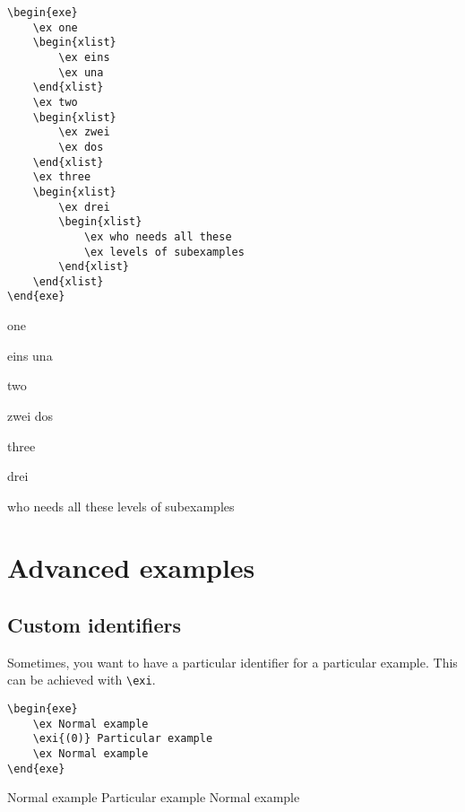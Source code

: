 \documentclass[output=guidelines]{langscibook}
\newcommand{\cmd}[1]{\texttt{\textbackslash#1}}
\begin{document}
\begin{minipage}{.55\textwidth}
\begin{lstlisting}
\begin{exe}
    \ex one
    \begin{xlist}
        \ex eins
        \ex una
    \end{xlist}
    \ex two
    \begin{xlist}
        \ex zwei
        \ex dos
    \end{xlist}    
    \ex three
    \begin{xlist}
        \ex drei        
        \begin{xlist}
            \ex who needs all these
            \ex levels of subexamples
        \end{xlist}
    \end{xlist}
\end{exe}
 \end{lstlisting}
\end{minipage}
\parbox{.45\textwidth}{
\begin{exe}
    \ex one
    \begin{xlist}
        \ex eins
        \ex una
    \end{xlist}
    \ex two
    \begin{xlist}
        \ex zwei
        \ex dos
    \end{xlist}    
    \ex three
    \begin{xlist}
        \ex drei        
        \begin{xlist}
            \ex who needs all these
            \ex levels of subexamples
        \end{xlist}
    \end{xlist}
\end{exe}
}




\section{Advanced examples}
\subsection{Custom identifiers}
Sometimes, you want to have a particular identifier for a particular example. This can be achieved with \cmd{exi}.

\begin{minipage}{.55\textwidth}
\begin{lstlisting}
\begin{exe}
    \ex Normal example
    \exi{(0)} Particular example
    \ex Normal example
\end{exe}
 \end{lstlisting}
\end{minipage}
\parbox{.45\textwidth}{
\begin{exe}
    \ex Normal example
     Particular example
    \ex Normal example
\end{exe}
}
\end{document}
